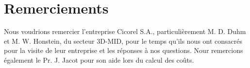 \clearpage
\section{Remerciements}
Nous voudrions remercier l'entreprise Cicorel S.A., particulièrement M. D. Duhm et M. W. Honstein, du secteur 3D-MID, pour le temps qu'ils nous ont consacrés pour la visite de leur entreprise et les réponses à nos questions.
Nour remercions également le Pr. J. Jacot pour son aide lors du calcul des coûts.
